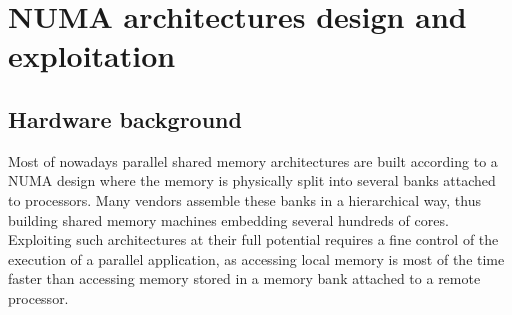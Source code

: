 \documentclass{Styles/llncs}
\newcommand{\benchs}{KASTORS }
\begin{document}

\section{NUMA architectures design and exploitation}
\label{sec:background}
\subsection{Hardware background}
\label{sec:hardware}
Most of nowadays parallel shared memory architectures are built according to a NUMA design where the memory is physically split into several banks attached to processors.
Many vendors assemble these banks in a hierarchical way, thus building shared memory machines embedding several hundreds of cores.
Exploiting such architectures at their full potential requires a fine control of the execution of a parallel application, as accessing local memory is most of the time faster than accessing memory stored in a memory bank attached to a remote processor.
\end{document}
